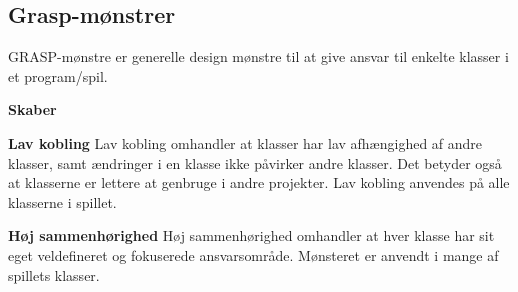 \subsection{Grasp-mønstrer}
GRASP-mønstre er generelle design mønstre til at give ansvar til enkelte klasser i et program/spil.

\vspace{.3cm}
\textbf{Skaber}


\vspace{.3cm}
\textbf{Lav kobling}
Lav kobling omhandler at klasser har lav afhængighed af andre klasser, samt ændringer i en klasse ikke påvirker andre klasser. Det betyder også at klasserne er lettere at genbruge i andre projekter. Lav kobling anvendes på alle klasserne i spillet. 

\vspace{.3cm}
\textbf{Høj sammenhørighed}
Høj sammenhørighed omhandler at hver klasse har sit eget veldefineret og fokuserede ansvarsområde. Mønsteret er anvendt i mange af spillets klasser.




